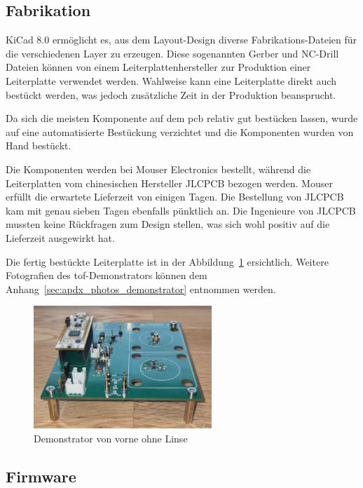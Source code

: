 \subsection{Fabrikation}
KiCad 8.0 ermöglicht es, aus dem Layout-Design diverse Fabrikations-Dateien für die verschiedenen Layer zu erzeugen.
Diese sogenannten Gerber und NC-Drill Dateien können von einem Leiterplattenhersteller zur Produktion einer Leiterplatte
verwendet werden. Wahlweise kann eine Leiterplatte direkt auch bestückt werden, was jedoch zusätzliche Zeit in der Produktion
beansprucht.

Da sich die meisten Komponente auf dem \acrshort{pcb} relativ gut bestücken lassen, wurde auf eine automatisierte Bestückung
verzichtet und die Komponenten wurden von Hand bestückt.

Die Komponenten werden bei Mouser Electronics bestellt, während die Leiterplatten vom chinesischen Hersteller JLCPCB
\cite{jlc2025jlcpcb} bezogen werden. Mouser erfüllt die erwartete Lieferzeit von einigen Tagen. Die Bestellung von
JLCPCB kam mit genau sieben Tagen ebenfalls pünktlich an. Die Ingenieure von JLCPCB mussten keine Rückfragen zum Design
stellen, was sich wohl positiv auf die Lieferzeit ausgewirkt hat.

Die fertig bestückte Leiterplatte ist in der Abbildung~\ref{fig:photo_demonstrator_front_wo_lens} ersichtlich. Weitere
Fotografien des \acrshort{tof}-Demonstrators können dem Anhang~\ref{sec:apdx_photos_demonstrator} entnommen werden.

\begin{figure}[H]
    \centering
    \includegraphics[width=0.6\textwidth]{graphics/photo_demonstrator_front_wo_lens.jpg}
    \caption{Demonstrator von vorne ohne Linse}\label{fig:photo_demonstrator_front_wo_lens}
\end{figure}

\subsection{Firmware}

